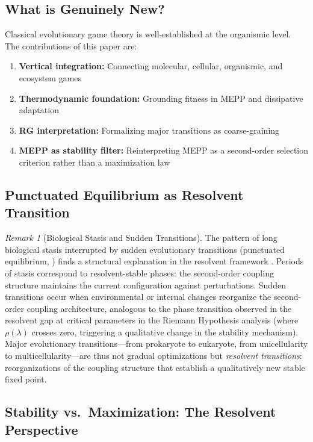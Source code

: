\documentclass[12pt,a4paper]{article}
\theoremstyle{remark}
\newtheorem{remark}{Remark}
\begin{document}
\subsection{What is Genuinely New?}

Classical evolutionary game theory is well-established at the organismic level. The contributions of this paper are:
\begin{enumerate}
    \item \textbf{Vertical integration:} Connecting molecular, cellular, organismic, and ecosystem games
    \item \textbf{Thermodynamic foundation:} Grounding fitness in MEPP and dissipative adaptation
    \item \textbf{RG interpretation:} Formalizing major transitions as coarse-graining
    \item \textbf{MEPP as stability filter:} Reinterpreting MEPP as a second-order selection criterion rather than a maximization law
\end{enumerate}

\subsection{Punctuated Equilibrium as Resolvent Transition}

\begin{remark}[Biological Stasis and Sudden Transitions]
\label{rem:punctuated-equilibrium}
The pattern of long biological stasis interrupted by sudden evolutionary transitions (punctuated equilibrium, \citealp{KauffmanOrigins}) finds a structural explanation in the resolvent framework \citep{FST-RH2}. Periods of stasis correspond to resolvent-stable phases: the second-order coupling structure maintains the current configuration against perturbations. Sudden transitions occur when environmental or internal changes reorganize the second-order coupling architecture, analogous to the phase transition observed in the resolvent gap at critical parameters in the Riemann Hypothesis analysis (where $\rho(\lambda)$ crosses zero, triggering a qualitative change in the stability mechanism). Major evolutionary transitions---from prokaryote to eukaryote, from unicellularity to multicellularity---are thus not gradual optimizations but \emph{resolvent transitions}: reorganizations of the coupling structure that establish a qualitatively new stable fixed point.
\end{remark}

\subsection{Stability vs.\ Maximization: The Resolvent Perspective}
\end{document}
